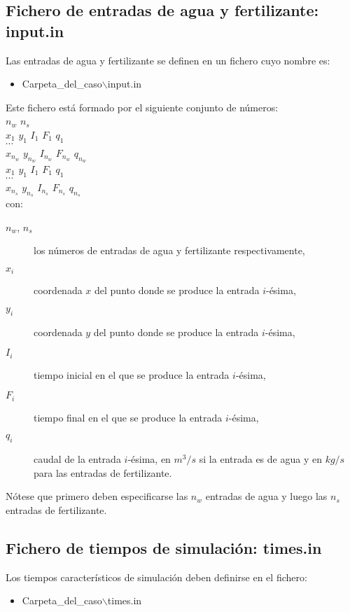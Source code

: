 \subsection{Fichero de entradas de agua y fertilizante: input.in}

Las entradas de agua y fertilizante se definen en un fichero cuyo nombre es:
\begin{itemize}
\item Carpeta\_del\_caso$\backslash$input.in
\end{itemize}

Este fichero está formado por el siguiente conjunto de números:\\
$n_w$ $n_s$\\
$x_1$ $y_1$ $I_1$ $F_1$ $q_1$\\
$\cdots$\\
$x_{n_w}$ $y_{n_w}$ $I_{n_w}$ $F_{n_w}$ $q_{n_w}$\\
$x_1$ $y_1$ $I_1$ $F_1$ $q_1$\\
$\cdots$\\
$x_{n_s}$ $y_{n_s}$ $I_{n_s}$ $F_{n_s}$ $q_{n_s}$\\
con:
\begin{description}
\item[$n_w$, $n_s$] los números de entradas de agua y fertilizante
	respectivamente,
\item[$x_i$] coordenada $x$ del punto donde se produce la entrada $i$-ésima,
\item[$y_i$] coordenada $y$ del punto donde se produce la entrada $i$-ésima,
\item[$I_i$] tiempo inicial en el que se produce la entrada $i$-ésima,
\item[$F_i$] tiempo final en el que se produce la entrada $i$-ésima,
\item[$q_i$] caudal de la entrada $i$-ésima, en $m^3/s$ si la entrada es de
	agua y en $kg/s$ para las entradas de fertilizante.
\end{description}
Nótese que primero deben especificarse las $n_w$ entradas de agua y luego las
$n_s$ entradas de fertilizante.

\subsection{Fichero de tiempos de simulación: times.in\label{SecTiempos}}

Los tiempos característicos de simulación deben definirse en el fichero:
\begin{itemize}
\item Carpeta\_del\_caso$\backslash$times.in
\end{itemize}

